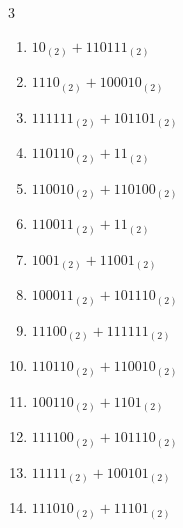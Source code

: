 \begin{multicols}{3}
\begin{enumerate}
  \item $10_{(2)} + 110111_{(2)}$


  \item $1110_{(2)} + 100010_{(2)}$


  \item $111111_{(2)} + 101101_{(2)}$


  \item $110110_{(2)} + 11_{(2)}$


  \item $110010_{(2)} + 110100_{(2)}$


  \item $110011_{(2)} + 11_{(2)}$


  \item $1001_{(2)} + 11001_{(2)}$


\columnbreak %

  \item $100011_{(2)} + 101110_{(2)}$


  \item $11100_{(2)} + 111111_{(2)}$


  \item $110110_{(2)} + 110010_{(2)}$


  \item $100110_{(2)} + 1101_{(2)}$


  \item $111100_{(2)} + 101110_{(2)}$


  \item $11111_{(2)} + 100101_{(2)}$


  \item $111010_{(2)} + 11101_{(2)}$


\end{enumerate}
\end{multicols}
